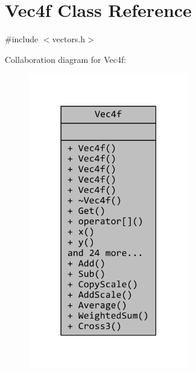 \hypertarget{classVec4f}{\section{Vec4f Class Reference}
\label{classVec4f}
}


{\ttfamily \#include $<$vectors.\+h$>$}



Collaboration diagram for Vec4f\+:
\nopagebreak
\begin{figure}[H]
\begin{center}
\leavevmode
\includegraphics[width=198pt]{classVec4f__coll__graph}
\end{center}
\end{figure}
